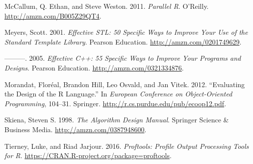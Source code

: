 \documentclass[]{book}
\begin{document}
\leavevmode\hypertarget{ref-parallel-r}{}%
McCallum, Q. Ethan, and Steve Weston. 2011. \emph{Parallel R}. O'Reilly. \url{http://amzn.com/B005Z29QT4}.

\leavevmode\hypertarget{ref-effective-stl}{}%
Meyers, Scott. 2001. \emph{Effective STL: 50 Specific Ways to Improve Your Use of the Standard Template Library}. Pearson Education. \url{http://amzn.com/0201749629}.

\leavevmode\hypertarget{ref-effective-cpp}{}%
---------. 2005. \emph{Effective C++: 55 Specific Ways to Improve Your Programs and Designs}. Pearson Education. \url{http://amzn.com/0321334876}.

\leavevmode\hypertarget{ref-r-design}{}%
Morandat, Floréal, Brandon Hill, Leo Osvald, and Jan Vitek. 2012. ``Evaluating the Design of the R Language.'' In \emph{European Conference on Object-Oriented Programming}, 104--31. Springer. \url{http://r.cs.purdue.edu/pub/ecoop12.pdf}.

\leavevmode\hypertarget{ref-alg-design-man}{}%
Skiena, Steven S. 1998. \emph{The Algorithm Design Manual}. Springer Science \& Business Media. \url{http://amzn.com/0387948600}.

\leavevmode\hypertarget{ref-proftools}{}%
Tierney, Luke, and Riad Jarjour. 2016. \emph{Proftools: Profile Output Processing Tools for R}. \url{https://CRAN.R-project.org/package=proftools}.

\backmatter
\cleardoublepage
{}
\printindex
\end{document}
